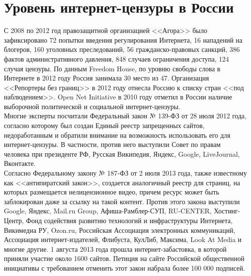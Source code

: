 \chapter{Уровень интернет-цензуры в России}
С 2008 по 2012 год правозащитной организацией <<Агора>> было зафиксировано 72 попытки введения регулирования Интернета, 16 нападений на блогеров, 160 уголовных преследований, 56 гражданско-правовых санкций, 386 фактов административного давления, 848 случаев ограничения доступа, 124 случая цензуры\cite{agoranet,agoranet2011,agoranet2012}. По данным Freedom House, по уровню свободы слова в Интернете в 2012 году Россия занимала 30 место из 47\cite{netfreedom}. Организация <<Репортеры без границ>> в 2012 году отнесла Россию к списку стран <<под наблюдением>>\cite{rsf}. Open Net Initiative в 2010 году отметил в России наличие выборочной политической и социальной интернет-цензуры\cite{opennet}.\\
Многие эксперты посчитали Федеральный закон № 139-ФЗ от 28 июля 2012 года, согласно которому был создан Единый реестр запрещенных сайтов, недоработанным и обратили внимание на возможность использовать его для интернет-цензуры\cite{lenta}. В частности, против него выступили Совет по правам человека при президенте РФ\cite{139_presidentsoviet}, Русская Википедия\cite{139_wiki}, Яндекс\cite{139_yandex}, Google\cite{139_google}, LiveJournal\cite{139_livejournal}, Вконтакте\cite{139_vk}.\\
Согласно Федеральному закону № 187-ФЗ от 2 июля 2013 года, также известному как <<антипиратский закон>>, создается аналогичный реестр для страниц, на которых размещается нелицензионное видео, причем ресурс может быть заблокирован даже за ссылку на такой контент. Против этого закона выступили Google, Яндекс, Mail.ru Group, Афиша-Рамблер-СУП, RU-CENTER, Хостинг-Центр, Фонд содействия развитию технологий и инфраструктуры Интернета, Викимедиа РУ, Ozon.ru, Российская Ассоциация электронных коммуникаций, Ассоциация интернет-издателей\cite{187_raec}, Флибуста, КулЛиб, Максима\cite{187_lib}, Look At Media\cite{187_look} и многие другие. 1 августа 2013 года прошла интернет-забастовка, в которой приняли участие около 1600 сайтов\cite{187_strike}. Петиция на сайте Российской общественной инициативы с требованием отменить этот закон набрала более 100 000 подписей\cite{187_roi}. 
